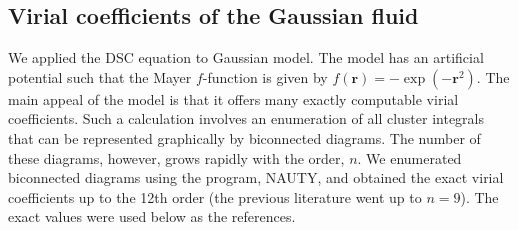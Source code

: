 \documentclass[aip,jcp,preprint,superscriptaddress,showpacs,preprintnumbers,amsmath,amssymb]{revtex4-1}
\newcommand{\vct}[1]{\mathbf{#1}}
\providecommand{\vr}{} %
\renewcommand{\vr}{\vct{r}}
\begin{document}
\subsection{\label{sec:gaussian_results}
Virial coefficients of the Gaussian fluid}





We applied the DSC equation to Gaussian model\cite{
uhlenbeck1962,
adin1992, *baram1986, baram1991}.
%
The model has an artificial potential
such that the Mayer $f$-function
is given by $f(\vr) = -\exp(-\vr^2)$.
%
The main appeal of the model
is that it offers many exactly computable
virial coefficients\cite{
uhlenbeck1962, mcquarrie, baram1991}.
%
Such a calculation involves
an enumeration of all cluster integrals
that can be represented graphically
by biconnected diagrams\cite{
uhlenbeck1962, hansen}.
%
The number of these diagrams, however,
grows rapidly with the order, $n$.
%
We enumerated biconnected diagrams
using the program,
NAUTY\cite{mckay1981, *mckay2014},
and obtained the exact virial coefficients up to
the 12th order
(the previous literature\cite{baram1991}
went up to $n = 9$).
%
The exact values were used below as the references.
\end{document}
